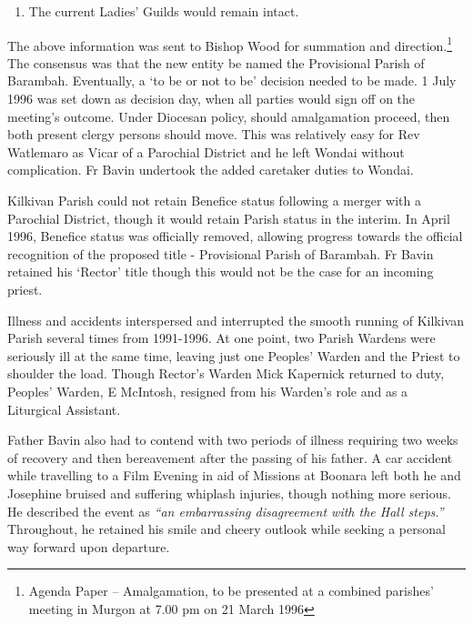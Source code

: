 \begin{enumerate}

\def\labelenumi{\arabic{enumi}.}

\setcounter{enumi}{5}

\item

  The current Ladies' Guilds would remain intact.

\end{enumerate}



\smallskip


The above information was sent to Bishop Wood for summation and direction.\footnote{Agenda Paper -- Amalgamation, to be presented at a combined parishes' meeting in Murgon at 7.00 pm on 21 March 1996} The consensus was that the new entity be named the Provisional Parish of Barambah. Eventually, a `to be or not to be' decision needed to be made. 1 July 1996 was set down as decision day, when all parties would sign off on the meeting's outcome. Under Diocesan policy, should amalgamation proceed, then both present clergy persons should move. This was relatively easy for Rev Watlemaro as Vicar of a Parochial District and he left Wondai without complication. Fr Bavin undertook the added caretaker duties to Wondai.


Kilkivan Parish could not retain Benefice status following a merger with a Parochial District, though it would retain Parish status in the interim. In April 1996, Benefice status was officially removed, allowing progress towards the official recognition of the proposed title - Provisional Parish of Barambah. Fr Bavin retained his `Rector' title though this would not be the case for an incoming priest.



Illness and accidents interspersed and interrupted the smooth running of Kilkivan Parish several times from 1991-1996. At one point, two Parish Wardens were seriously ill at the same time, leaving just one Peoples' Warden and the Priest to shoulder the load. Though Rector's Warden Mick Kapernick returned to duty, Peoples' Warden, E McIntosh, resigned from his Warden's role and as a Liturgical Assistant.



Father Bavin also had to contend with two periods of illness requiring two weeks of recovery and then bereavement after the passing of his father. A car accident while travelling to a Film Evening in aid of Missions at Boonara left both he and Josephine bruised and suffering whiplash injuries, though nothing more serious. He described the event as \emph{``an embarrassing disagreement with the Hall steps.''} Throughout, he retained his smile and cheery outlook while seeking a personal way forward upon departure.



